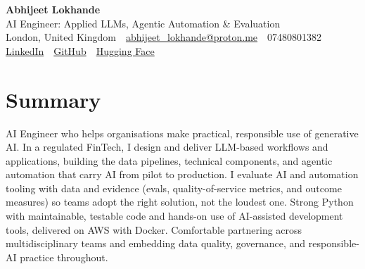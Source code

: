 \documentclass[10pt,a4paper]{article}
\newcommand{\sep}{\,\textcolor{accent!60}{\textbar}\,}
\begin{document}
\begin{center}
  {\fontsize{24}{26}\selectfont\bfseries Abhijeet Lokhande}\\[3pt]
  {\color{accent}\large AI Engineer: Applied LLMs, Agentic Automation \& Evaluation}\\[5pt]
  {\small
    London, United Kingdom \sep
    \href{mailto:abhijeet_lokhande@proton.me}{abhijeet\_lokhande@proton.me} \sep
    07480801382 \\[2pt]
    \href{https://www.linkedin.com/in/ablds/}{LinkedIn} \sep
    \href{https://github.com/abhijeetscode}{GitHub} \sep
    \href{https://huggingface.co/ab-ai}{Hugging Face}
  }
\end{center}
\vspace{2pt}

\section{Summary}
AI Engineer who helps organisations make practical, responsible use of generative AI. In a regulated FinTech, I design and deliver LLM-based workflows and applications, building the data pipelines, technical components, and agentic automation that carry AI from pilot to production. I evaluate AI and automation tooling with data and evidence (evals, quality-of-service metrics, and outcome measures) so teams adopt the right solution, not the loudest one. Strong Python with maintainable, testable code and hands-on use of AI-assisted development tools, delivered on AWS with Docker. Comfortable partnering across multidisciplinary teams and embedding data quality, governance, and responsible-AI practice throughout.

\end{document}
